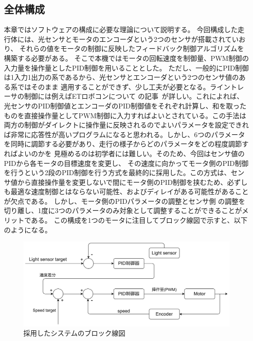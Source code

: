 \documentclass{ltjsreport}
\begin{document}
\subsection{全体構成}
本章ではソフトウェアの構成に必要な理論について説明する。
今回構成した走行体には、光センサとモータのエンコーダという2つのセンサが搭載されていおり、
それらの値をモータの制御に反映したフィードバック制御アルゴリズムを構築する必要がある。
そこで本機ではモータの回転速度を制御量、PWM制御の入力量を操作量としたPID制御を用いることとした。
ただし、一般的にPID制御は1入力1出力の系であるから、光センサとエンコーダという2つのセンサ値のある系ではそのまま
適用することができず、少し工夫が必要となる。ライントレーサの制御には例えばETロボコンについて
の記事~\cite{ETM}が詳しい。これによれば、光センサのPID制御値とエンコーダのPID制御値をそれぞれ計算し、和を取ったものを直接操作量としてPWM制御に入力すればよいとされている。この手法は両方の制御がダイレクトに操作量に反映されるのでよいパラメータを設定できれば非常に応答性が高いプログラムになると思われる。しかし、6つのパラメータを同時に調節する必要があり、走行の様子からどのパラメータをどの程度調節すればよいのかを
見極めるのは初学者には難しい。そのため、今回はセンサ値のPIDから各モータの目標速度を変更し、
その速度に向かってモータ側のPID制御を行うという2段のPID制御を行う方式を最終的に採用した。この方式は、センサ値から直接操作量を変更しないで間にモータ側のPID制御を挟むため、必ずしも最適な速度制御とはならない可能性、およびディレイがある可能性があることが欠点である。
しかし、モータ側のPIDパラメータの調整とセンサ側
の調整を切り離し、1度に3つのパラメータのみ対象として調整することができることがメリットである。
この構成を1つのモータに注目してブロック線図で示すと、以下のようになる。

\begin{figure}[tbh]
  \centering
  \includegraphics[keepaspectratio, scale=0.05]
       {img/block_line.drawio.png}
  \caption{採用したシステムのブロック線図}
  \label{fig:blockline}
 \end{figure}
\end{document}
